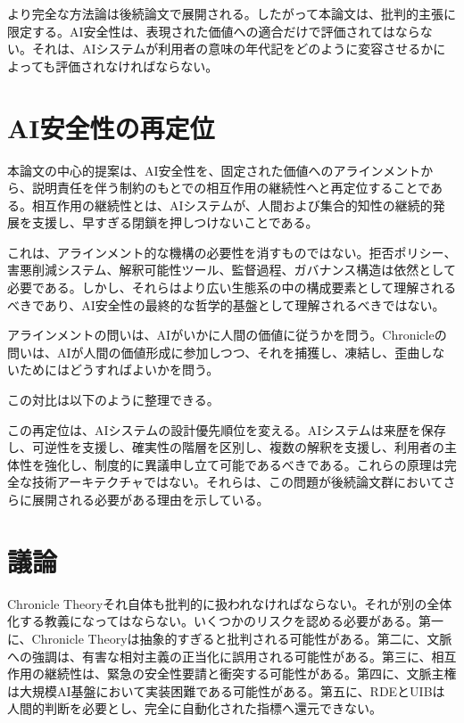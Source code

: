 \documentclass[11pt,a4paper]{ltjsarticle}
\begin{document}
より完全な方法論は後続論文で展開される。したがって本論文は、批判的主張に限定する。AI安全性は、表現された価値への適合だけで評価されてはならない。それは、AIシステムが利用者の意味の年代記をどのように変容させるかによっても評価されなければならない。

\section{AI安全性の再定位}

本論文の中心的提案は、AI安全性を、固定された価値へのアラインメントから、説明責任を伴う制約のもとでの相互作用の継続性へと再定位することである。相互作用の継続性とは、AIシステムが、人間および集合的知性の継続的発展を支援し、早すぎる閉鎖を押しつけないことである。

これは、アラインメント的な機構の必要性を消すものではない。拒否ポリシー、害悪削減システム、解釈可能性ツール、監督過程、ガバナンス構造は依然として必要である。しかし、それらはより広い生態系の中の構成要素として理解されるべきであり、AI安全性の最終的な哲学的基盤として理解されるべきではない。

アラインメントの問いは、AIがいかに人間の価値に従うかを問う。Chronicleの問いは、AIが人間の価値形成に参加しつつ、それを捕獲し、凍結し、歪曲しないためにはどうすればよいかを問う。

この対比は以下のように整理できる。



この再定位は、AIシステムの設計優先順位を変える。AIシステムは来歴を保存し、可逆性を支援し、確実性の階層を区別し、複数の解釈を支援し、利用者の主体性を強化し、制度的に異議申し立て可能であるべきである。これらの原理は完全な技術アーキテクチャではない。それらは、この問題が後続論文群においてさらに展開される必要がある理由を示している。

\section{議論}

Chronicle Theoryそれ自体も批判的に扱われなければならない。それが別の全体化する教義になってはならない。いくつかのリスクを認める必要がある。第一に、Chronicle Theoryは抽象的すぎると批判される可能性がある。第二に、文脈への強調は、有害な相対主義の正当化に誤用される可能性がある。第三に、相互作用の継続性は、緊急の安全性要請と衝突する可能性がある。第四に、文脈主権は大規模AI基盤において実装困難である可能性がある。第五に、RDEとUIBは人間的判断を必要とし、完全に自動化された指標へ還元できない。
\end{document}
